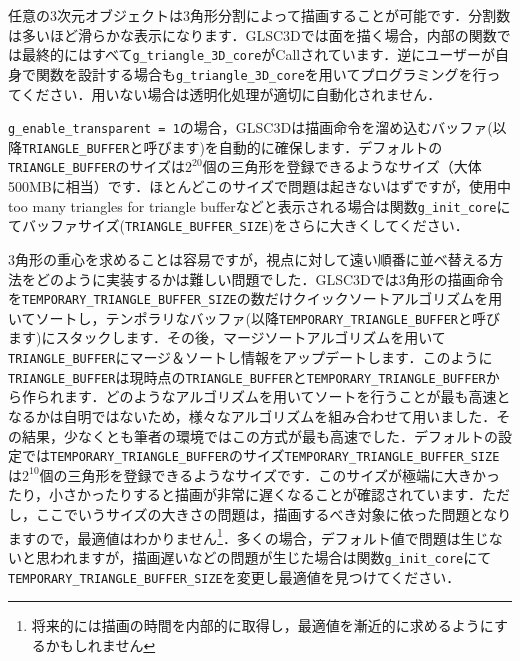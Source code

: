 \documentclass[platex,a4paper,12pt]{jsarticle}%
\begin{document}

任意の3次元オブジェクトは3角形分割によって描画することが可能です．分割数は多いほど滑らかな表示になります．GLSC3Dでは面を描く場合，内部の関数では最終的にはすべて\verb|g_triangle_3D_core|がCallされています．逆にユーザーが自身で関数を設計する場合も\verb|g_triangle_3D_core|を用いてプログラミングを行ってください．用いない場合は透明化処理が適切に自動化されません．


\verb|g_enable_transparent = 1|の場合，GLSC3Dは描画命令を溜め込むバッファ(以降\verb|TRIANGLE_BUFFER|と呼びます)を自動的に確保します．デフォルトの\verb|TRIANGLE_BUFFER|のサイズは$2^{20}$個の三角形を登録できるようなサイズ（大体500MBに相当）です．ほとんどこのサイズで問題は起きないはずですが，使用中too many triangles for triangle bufferなどと表示される場合は関数\verb|g_init_core|にてバッファサイズ(\verb|TRIANGLE_BUFFER_SIZE|)をさらに大きくしてください．


3角形の重心を求めることは容易ですが，視点に対して遠い順番に並べ替える方法をどのように実装するかは難しい問題でした．GLSC3Dでは3角形の描画命令を\verb|TEMPORARY_TRIANGLE_BUFFER_SIZE|の数だけクイックソートアルゴリズムを用いてソートし，テンポラリなバッファ(以降\verb|TEMPORARY_TRIANGLE_BUFFER|と呼びます)にスタックします．その後，マージソートアルゴリズムを用いて\verb|TRIANGLE_BUFFER|にマージ＆ソートし情報をアップデートします．このように\verb|TRIANGLE_BUFFER|は現時点の\verb|TRIANGLE_BUFFER|と\verb|TEMPORARY_TRIANGLE_BUFFER|から作られます．どのようなアルゴリズムを用いてソートを行うことが最も高速となるかは自明ではないため，様々なアルゴリズムを組み合わせて用いました．その結果，少なくとも筆者の環境ではこの方式が最も高速でした．デフォルトの設定では\verb|TEMPORARY_TRIANGLE_BUFFER|のサイズ\verb|TEMPORARY_TRIANGLE_BUFFER_SIZE|は$2^{10}$個の三角形を登録できるようなサイズです．このサイズが極端に大きかったり，小さかったりすると描画が非常に遅くなることが確認されています．ただし，ここでいうサイズの大きさの問題は，描画するべき対象に依った問題となりますので，最適値はわかりません\footnote{将来的には描画の時間を内部的に取得し，最適値を漸近的に求めるようにするかもしれません}．多くの場合，デフォルト値で問題は生じないと思われますが，描画遅いなどの問題が生じた場合は関数\verb|g_init_core|にて\verb|TEMPORARY_TRIANGLE_BUFFER_SIZE|を変更し最適値を見つけてください．
\end{document}
